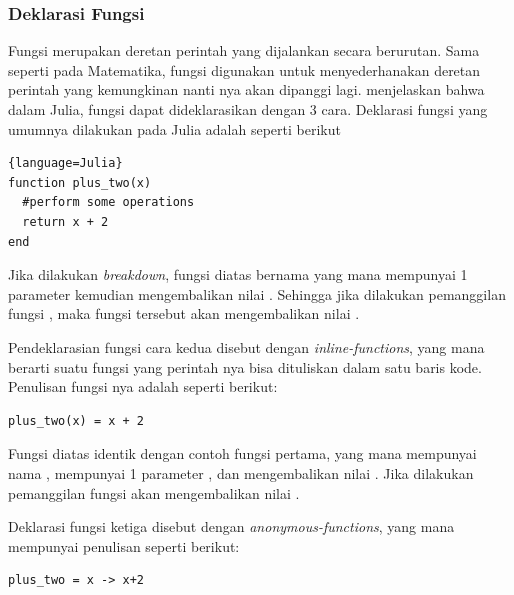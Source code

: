 

\subsubsection{Deklarasi Fungsi}

Fungsi merupakan deretan perintah yang dijalankan secara berurutan. Sama seperti
pada Matematika, fungsi digunakan untuk menyederhanakan deretan perintah yang kemungkinan
nanti nya akan dipanggi lagi. \cite{amerioFunctions2019} menjelaskan bahwa dalam
Julia, fungsi dapat dideklarasikan dengan 3 cara. Deklarasi fungsi yang umumnya
dilakukan pada Julia adalah seperti berikut

\begin{lstlisting}[label={contoh deklarasi fungsi 1}]{language=Julia}
function plus_two(x)
  #perform some operations
  return x + 2
end
\end{lstlisting}

\noindent
Jika dilakukan \emph{breakdown}, fungsi diatas bernama  yang mana mempunyai
1 parameter  kemudian mengembalikan nilai . Sehingga jika
dilakukan pemanggilan fungsi , maka fungsi tersebut akan
mengembalikan nilai .

Pendeklarasian fungsi cara kedua disebut dengan \emph{inline-functions}, yang mana
berarti suatu fungsi yang perintah nya bisa dituliskan dalam satu baris kode.
Penulisan fungsi nya adalah seperti berikut:

\begin{lstlisting}[label={contoh deklarasi fungsi 2}]
plus_two(x) = x + 2
\end{lstlisting}

\noindent
Fungsi diatas identik dengan contoh fungsi pertama, yang mana mempunyai nama ,
mempunyai 1 parameter , dan mengembalikan nilai . Jika dilakukan
pemanggilan fungsi  akan mengembalikan nilai .

Deklarasi fungsi ketiga disebut dengan \emph{anonymous-functions}, yang mana
mempunyai penulisan seperti berikut:

\begin{lstlisting}
plus_two = x -> x+2
\end{lstlisting}

